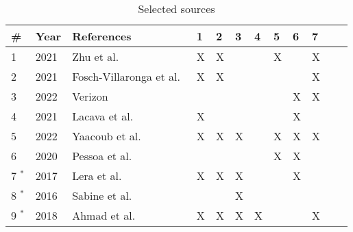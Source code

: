 \begin{table}[h]
  \centering
  \small
  \caption{Selected sources}
  \label{table:selected_sources}
  \begin{tabularx}{\textwidth}{|l|l|X|l|l|l|l|l|l|l|l|l|}
    \hline
    \textbf{\#}  & \textbf{Year} & \textbf{References}                                                         & \textbf{1} & \textbf{2} & \textbf{3} & \textbf{4} & \textbf{5}& \textbf{6}& \textbf{7}  \\\hline
    1            & 2021          & Zhu et al.~\cite[]{introduction_to_robot_system_security_2021}              & X          & X          &            &            & X          &            & X          \\\hline
    2            & 2021          & Fosch-Villaronga et al.~\cite[]{cyber_sec_safet_robots_legal_2021}          & X          & X          &            &            &  &  & X \\\hline
    3            & 2022          & Verizon~\cite[]{dbir_2022}                                                  &            &            &            &            &            & X          & X          \\\hline
    4            & 2021          & Lacava et al.~\cite[]{cyber_security_issues_in_robotics_2021}               & X          &            &            &            &            & X          &            \\\hline
    5            & 2022          & Yaacoub et al.~\cite[]{robotics_cyber_security_2022}                        & X          & X          & X          &            & X          & X          & X          \\\hline
    6            & 2020          & Pessoa et al.~\cite[]{smart_design_engineering_2020}                        &            &            &            &            & X          & X          &            \\\hline
    7 $^{\ast}$  & 2017          & Lera et al.~\cite[]{cyber_sec_robotics_privacy_safety_2017}                 & X          & X & X &  &  & X &  \\\hline
    8 $^{\ast}$  & 2016          & Sabine et al.~\cite[]{if_robots_cause_harm_2016}                            &            &            & X          &            &            &            &            \\\hline
    9 $^{\ast}$  & 2018          & Ahmad et al.~\cite[]{analyzing_cyber_physical_threats_2018}                 & X          & X & X & X &  &  & X \\\hline

\end{tabularx}
\end{table}
